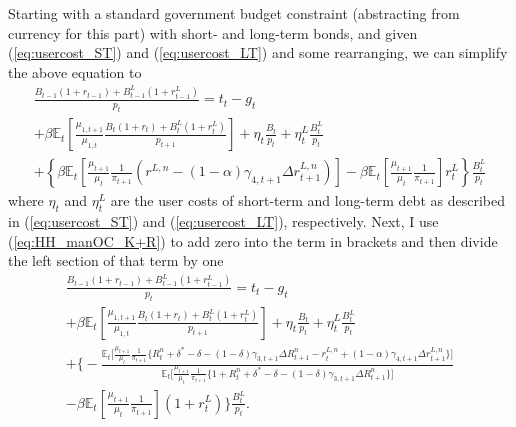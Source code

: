 \documentclass[11pt,a4paper,margin=1.5in]{article}
\begin{document}
Starting with a standard government budget constraint (abstracting from currency for this part) with short- and long-term bonds, and given (\ref{eq:usercost_ST}) and (\ref{eq:usercost_LT}) and some rearranging, we can simplify the above equation to
\begin{multline}
	\frac{B_{t-1}(1+r_{t-1})+B^L_{t-1}(1+r^L_{t-1})}{p_t} = t_t - g_t \\ + \beta\mathbb{E}_t\left[\frac{\mu_{1,t+1}}{\mu_{1,t}} \frac{B_{t}(1+r_{t})+B^L_{t}(1+r^L_{t})}{p_{t+1}}\right] +  \eta_t\frac{B_t}{p_t} +\eta^L_t\frac{B^L_t}{p_t}\\
		+ \left\{ \beta \mathbb{E}_t\left[ \frac{\mu_{t+1}}{\mu_t}\frac{1}{\pi_{t+1}} \left(r^{L,n} - (1-\alpha)\gamma_{4,t+1}\Delta r^{L,n}_{t+1}\right)\right] - \beta \mathbb{E}_t\left[\frac{\mu_{t+1}}{\mu_t}\frac{1}{\pi_{t+1}}\right]r^L_t\right\} \frac{B^L_t}{p_t}
\end{multline}
where $\eta_t$ and $\eta^L_t$ are the user costs of short-term and long-term debt as described in (\ref{eq:usercost_ST}) and (\ref{eq:usercost_LT}), respectively.
Next, I use (\ref{eq:HH_manOC_K+R}) to add zero into the term in brackets and then divide the left section of that term by one 
 \begin{multline}
	\frac{B_{t-1}(1+r_{t-1})+B^L_{t-1}(1+r^L_{t-1})}{p_t} = t_t - g_t \\ 
		+ \beta\mathbb{E}_t\left[\frac{\mu_{1,t+1}}{\mu_{1,t}} \frac{B_{t}(1+r_{t})+B^L_{t}(1+r^L_{t})}{p_{t+1}}\right] +  \eta_t\frac{B_t}{p_t} +\eta^L_t\frac{B^L_t}{p_t}\\
		+ \Bigg\{-\frac{\mathbb{E}_t \Big[ \frac{\mu_{t+1}}{\mu_{t}}\frac{1}{\pi_{t+1}} \Big\{ R^n_t + \delta^* - \delta - (1-\delta)\gamma_{3,t+1}\Delta R^n_{t+1} - r^{L,n}_t + (1-\alpha)\gamma_{4,t+1}\Delta r^{L,n}_{t+1}\Big\}\Big]}{\mathbb{E}_t \Big[ \frac{\mu_{t+1}}{\mu_{t}}\frac{1}{\pi_{t+1}} \Big\{ 1+ R^n_t + \delta^* - \delta - (1-\delta)\gamma_{3,t+1}\Delta R^n_{t+1}\Big\}\Big]} \\
		- \beta \mathbb{E}_t\left[\frac{\mu_{t+1}}{\mu_t}\frac{1}{\pi_{t+1}}\right](1+ r^L_t)\Bigg\} \frac{B^L_t}{p_t}.
\end{multline}
\end{document}
